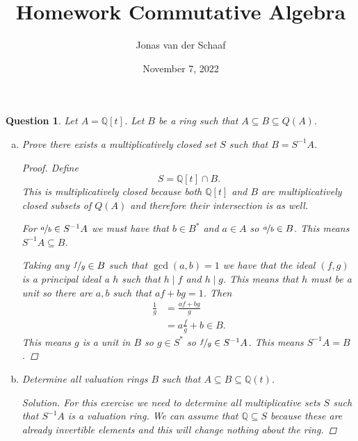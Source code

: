 \documentclass{article}
\title{Homework Commutative Algebra}
\author{Jonas van der Schaaf}
\date{November 7, 2022}
\newcommand{\Q}{\mathbb{Q}}
\newenvironment{solution}{\begin{proof}[Solution]\renewcommand\qedsymbol{}}{\end{proof}}
\newtheorem{question}{Question}
\theoremstyle{definition}
\begin{document}
\maketitle

\begin{question}
    Let \(A=\Q[t]\). Let \(B\) be a ring such that \(A\subseteq B\subseteq
    Q(A)\).

    \begin{enumerate}[(a)]
        \item Prove there exists a multiplicatively closed set \(S\) such that
              \(B=S^{-1}A\).

              \begin{proof}
                  Define
                  \[
                      S=\Q[t]\cap B.
                  \]
                  This is multiplicatively closed because both \(\Q[t]\) and
                  \(B\) are multiplicatively closed subsets of \(Q(A)\) and
                  therefore their intersection is as well.

                  For \(\nicefrac{a}{b}\in S^{-1}A\) we must have that \(b\in
                  B^{*}\) and \(a\in A\) so \(\nicefrac{a}{b}\in B\). This means
                  \(S^{-1}A\subseteq B\).

                  Taking any \(\nicefrac{f}{g}\in B\) such that \(\gcd(a,b)=1\)
                  we have that the ideal \((f,g)\) is a principal ideal a \(h\)
                  such that \(h\mid f\) and \(h\mid g\). This means that \(h\)
                  must be a unit so there are \(a,b\) such that \(af+bg=1\).
                  Then
                  \begin{align*}
                      \frac{1}{g} & =\frac{af+bg}{g}      \\
                                  & =a\frac{f}{g}+b\in B.
                  \end{align*}
                  This means \(g\) is a unit in \(B\) so \(g\in S^{*}\) so
                  \(\nicefrac{f}{g}\in S^{-1}A\). This means \(S^{-1}A=B\).
              \end{proof}

        \item Determine all valuation rings \(B\) such that \(A\subseteq
              B\subseteq\Q(t)\).

              \begin{solution}
                  For this exercise we need to determine all multiplicative sets
                  \(S\) such that \(S^{-1}A\) is a valuation ring. We can assume
                  that \(\Q\subseteq S\) because these are already invertible
                  elements and this will change nothing about the ring.


\end{solution}
\end{enumerate}
\end{question}
\end{document}
